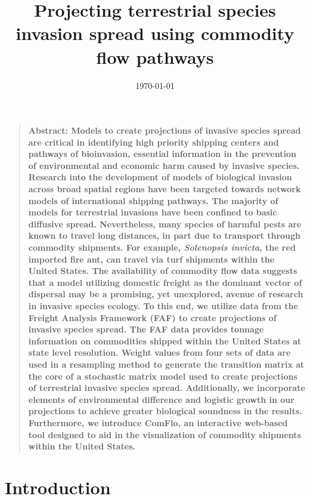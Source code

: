 \documentclass[12pt]{article}
\title{Projecting terrestrial species invasion spread using commodity flow pathways}
\author
{Ashish Gauli,$^{1,2}$ Nathan Wikle,$^{1,3}$ Ryan Yan,$^{1,4}$\\ 
Dr. Louis Gross,$^{1,5}$ Dr. Daniel Simberloff,$^{5}$ Angela Chuang,$^{5}$ Cedric Landerer$^{5}$\\
\\
\normalsize{$^{1}$National Institute for Mathematical and Biological Synthesis (NIMBioS)}\\
\normalsize{$^{2}$Computer Science, Fisk University}\\
\normalsize{$^{3}$Mathematics, Truman State University}\\
\normalsize{$^{4}$Mathematical Biology, College of William and Mary}\\
\normalsize{$^{5}$Ecology and Evolutionary Biology, University of Tennessee}\\
\\
}
\date{\today}
\newenvironment{sciabstract}{%
\begin{quote} \bf}
{\end{quote}}
\begin{document}
 


\baselineskip24pt


\maketitle 


 \begin{sciabstract}
Abstract: Models to create projections of invasive species spread are critical in identifying high priority shipping centers and pathways of bioinvasion, essential information in the prevention of environmental and economic harm caused by invasive species. Research into the development of models of biological invasion across broad spatial regions have been targeted towards network models of international shipping pathways. The majority of models for terrestrial invasions have been confined to basic diffusive spread. Nevertheless, many species of harmful pests are known to travel long distances, in part due to transport through commodity shipments. For example, \textit{Solenopsis invicta}, the red imported fire ant, can travel via turf shipments within the United States. The availability of commodity flow data suggests that a model utilizing domestic freight as the dominant vector of dispersal may be a promising, yet unexplored, avenue of research in invasive species ecology. To this end, we utilize data from the Freight Analysis Framework (FAF) to create projections of invasive species spread. The FAF data provides tonnage information on commodities shipped within the United States at state level resolution. Weight values from four sets of data are used in a resampling method to generate the transition matrix at the core of a stochastic matrix model used to create projections of terrestrial invasive species spread. Additionally, we incorporate elements of environmental difference and logistic growth in our projections to achieve greater biological soundness in the results. Furthermore, we introduce ComFlo, an interactive web-based tool designed to aid in the visualization of commodity shipments within the United States.
\end{sciabstract}



\section*{Introduction}
\end{document}
